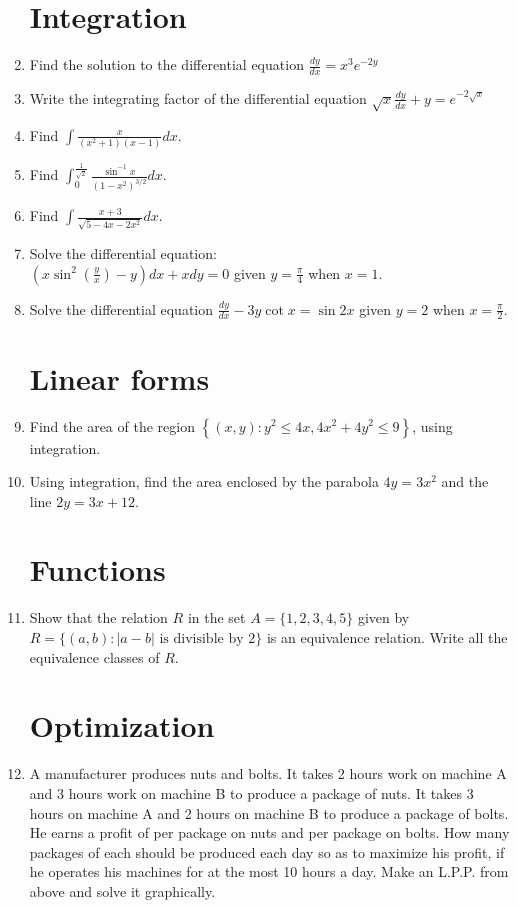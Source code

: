 \documentclass[10pt,-letter paper]{article}
\providecommand{\cbrak}[1]{\ensuremath{\left\{#1\right\}}}
\providecommand{\brak}[1]{\ensuremath{\left(#1\right)}}
\begin{document}
\begin{enumerate}
\section{Integration}
\item Find the solution to the differential equation 
$\frac{dy}{dx} = x^{3}e^{-2y}$
\item Write the integrating factor of the differential equation
$\sqrt{x}\frac{dy}{dx} + y = e^{-2\sqrt{x}}$ \\
\item Find $\int \frac{x}{\brak{x^2+1}\brak{x-1}}dx$.\\
\item Find $\int_{0}^{\frac{1}{\sqrt{2}}} \frac{\sin^{-1}x}{{\brak{1-x^2}}^{3/2}}dx$.\\
\item Find $\int \frac{x+3}{\sqrt{5-4x-2x^2}}dx$.\\
\item Solve the differential equation: \\
$\brak{x\sin^2{\brak{\frac{y}{x}}}-y}dx +xdy = 0$ given $y = \frac{\pi}{4}$ when $x=1$.\\
\item Solve the differential equation $\frac{dy}{dx}-3y\cot{x} = \sin{2x}$ given $y=2$ when $x=\frac{\pi}{2}$.\\
\section{Linear forms}
\item Find the area of the region $\cbrak{\brak{x,y} : y^2 \leq 4x, 4x^2+4y^2 \leq 9}$, using integration.\\
\item Using integration, find the area enclosed by the parabola $4y = 3x^2$ and the line $2y = 3x+12$. \\
\section{Functions}
\item Show that the relation $R$ in the set $A = \{1,2,3,4,5\}$ given by $R = \{\brak{a,b} : |a-b| \text{ is divisible by 2}\}$ is an equivalence relation. Write all the equivalence classes of $R$. \\ 
\section{Optimization}
\item A manufacturer produces nuts and bolts. It takes 2 hours work on machine A and 3 hours work on machine B to produce a package of nuts. It takes 3 hours on machine A and 2 hours on machine B to produce a package of bolts. He earns a profit of  per package on nuts and  per package on bolts. How many packages of each should be produced each day so as to maximize his profit, if he operates his machines for at the most 10 hours a day. Make an L.P.P. from above and solve it graphically.
\end{enumerate}
\end{document}

